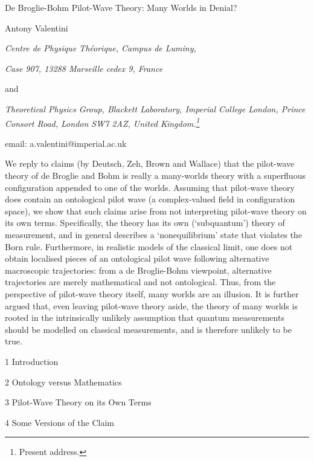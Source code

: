 \documentclass[12pt]{article}%
\begin{document}
\author{Antony Valentini\\Augustus College}

\begin{center}
{\LARGE De Broglie-Bohm Pilot-Wave Theory: Many Worlds in Denial?}

\bigskip

Antony Valentini

\bigskip

\textit{Centre de Physique Th\'{e}orique, Campus de Luminy,}

\textit{Case 907, 13288 Marseille cedex 9, France}

and

\textit{Theoretical Physics Group, Blackett Laboratory, Imperial College
London, Prince Consort Road, London SW7 2AZ, United Kingdom.\footnote{Present
address.}}

email: a.valentini@imperial.ac.uk

\bigskip
\end{center}

We reply to claims (by Deutsch, Zeh, Brown and Wallace) that the pilot-wave
theory of de Broglie and Bohm is really a many-worlds theory with a
superfluous configuration appended to one of the worlds. Assuming that
pilot-wave theory does contain an ontological pilot wave (a complex-valued
field in configuration space), we show that such claims arise from not
interpreting pilot-wave theory on its own terms. Specifically, the theory has
its own (`subquantum') theory of measurement, and in general describes a
`nonequilibrium' state that violates the Born rule. Furthermore, in realistic
models of the classical limit, one does not obtain localised pieces of an
ontological pilot wave following alternative macroscopic trajectories: from a
de Broglie-Bohm viewpoint, alternative trajectories are merely mathematical
and not ontological. Thus, from the perspective of pilot-wave theory itself,
many worlds are an illusion. It is further argued that, even leaving
pilot-wave theory aside, the theory of many worlds is rooted in the
intrinsically unlikely assumption that quantum measurements should be modelled
on classical measurements, and is therefore unlikely to be true.

\bigskip

\bigskip

1 Introduction

2 Ontology versus Mathematics

3 Pilot-Wave Theory on its Own Terms

4 Some Versions of the Claim
\end{document}
